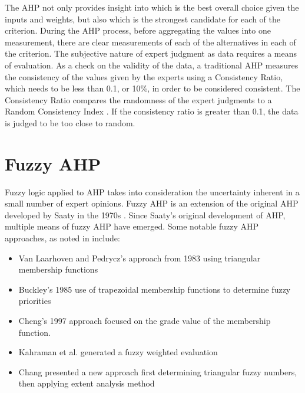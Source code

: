 The AHP not only provides insight into which is the best overall choice given the inputs and weights, but also which is the strongest candidate for each of the criterion. During the AHP process, before aggregating the values into one measurement, there are clear measurements of each of the alternatives in each of the criterion. The subjective nature of expert judgment as data requires a means of evaluation. As a check on the validity of the data, a traditional AHP measures the consistency of the values given by the experts using a Consistency Ratio, which needs to be less than 0.1, or 10\%, in order to be considered consistent. The Consistency Ratio compares the randomness of the expert judgments to a Random Consistency Index \cite{Saaty1987}.  If the consistency ratio is greater than 0.1, the data is judged to be too close to random.


\section{Fuzzy AHP}
Fuzzy logic applied to AHP takes into consideration the uncertainty inherent in a small number of expert opinions. Fuzzy AHP is an extension of the original AHP developed by Saaty in the 1970s \cite{Saaty1987}. Since Saaty's original development of AHP, multiple means of fuzzy AHP have emerged. Some notable fuzzy AHP approaches, as noted in \cite{Kahraman2010} include:
\begin{itemize}
\item Van Laarhoven and Pedrycz's approach from 1983 using triangular membership functions
\item Buckley's 1985 use of trapezoidal membership functions to determine fuzzy priorities
\item Cheng's 1997 approach focused on the grade value of the membership function.
\item Kahraman et al. generated a fuzzy weighted evaluation \cite{Kahraman2010}
\item Chang presented a new approach first determining triangular fuzzy numbers, then applying extent analysis method \cite{Chang1996}
\end{itemize}

